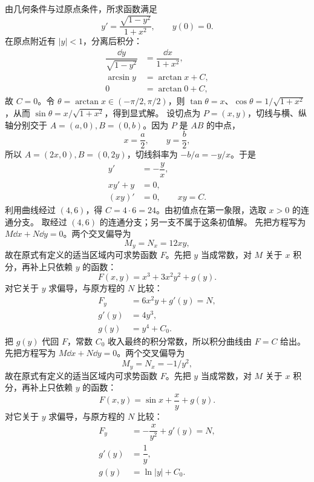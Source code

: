 由几何条件与过原点条件，所求函数满足
\[
y'=\dfrac{\sqrt{1-y^2}}{1+x^2},\qquad y(0)=0.
\]
在原点附近有 $|y|<1$，分离后积分：
\[
\begin{aligned}
\dfrac{\dd y}{\sqrt{1-y^2}}&=\dfrac{\dd x}{1+x^2},\\
\arcsin y&=\arctan x+C,\\
0&=\arctan0+C,
\end{aligned}
\]
故 $C=0$。令 $\theta=\arctan x\in(-\pi/2,\pi/2)$，则 $\tan\theta=x$、$\cos\theta=1/\sqrt{1+x^2}$，从而 $\sin\theta=x/\sqrt{1+x^2}$，得到显式解。
设切点为 $P=(x,y)$，切线与横、纵轴分别交于 $A=(a,0),B=(0,b)$。因为 $P$ 是 $AB$ 的中点，
\[
x=\dfrac a2,\qquad y=\dfrac b2,
\]
所以 $A=(2x,0),B=(0,2y)$，切线斜率为 $-b/a=-y/x$。于是
\[
\begin{aligned}
y'&=-\dfrac yx,\\
xy'+y&=0,\\
(xy)'&=0,\qquad xy=C.
\end{aligned}
\]
利用曲线经过 $(4,6)$，得 $C=4\cdot6=24$。由初值点在第一象限，选取 $x>0$ 的连通分支。
取经过 $(4,6)$ 的连通分支；另一支不属于这条初值解。
先把方程写为 $M\dd x+N\dd y=0$。两个交叉偏导为
\[
M_y=N_x=12xy,
\]
故在原式有定义的适当区域内可求势函数 $F$。先把 $y$ 当成常数，对 $M$ 关于 $x$ 积分，再补上只依赖 $y$ 的函数：
\[
F(x,y)=x^3+3x^2y^2+g(y).
\]
对它关于 $y$ 求偏导，与原方程的 $N$ 比较：
\[
\begin{aligned}
F_y&=6x^2y+g'(y)=N,\\
g'(y)&=4y^3,\\
g(y)&=y^4+C_0.
\end{aligned}
\]
把 $g(y)$ 代回 $F$，常数 $C_0$ 收入最终的积分常数，所以积分曲线由 $F=C$ 给出。
先把方程写为 $M\dd x+N\dd y=0$。两个交叉偏导为
\[
M_y=N_x=-1/y^2,
\]
故在原式有定义的适当区域内可求势函数 $F$。先把 $y$ 当成常数，对 $M$ 关于 $x$ 积分，再补上只依赖 $y$ 的函数：
\[
F(x,y)=\sin x+\dfrac xy+g(y).
\]
对它关于 $y$ 求偏导，与原方程的 $N$ 比较：
\[
\begin{aligned}
F_y&=-\dfrac{x}{y^2}+g'(y)=N,\\
g'(y)&=\dfrac1y,\\
g(y)&=\ln|y|+C_0.
\end{aligned}
\]
